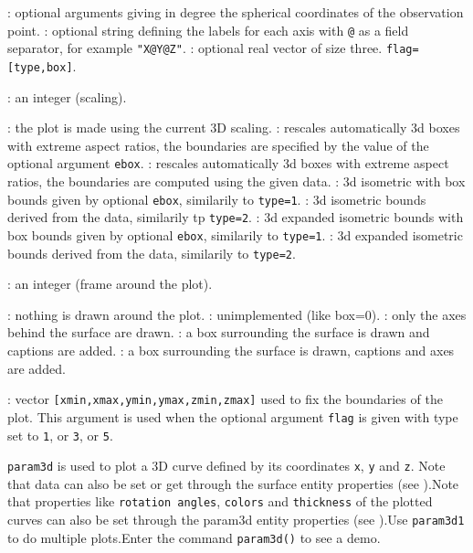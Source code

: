 \begin{parameters}
\begin{varlist}
    : optional arguments giving in degree the spherical coordinates of the
    observation point.
    : optional string defining the labels for each axis with \verb!@! as a field
    separator, for example \verb!"X@Y@Z"!.
    : optional real vector of size three.
    \verb!flag=[type,box]!.
    \begin{varlist}
      : an integer (scaling).
      \begin{varlist}
        : the plot is made using the current 3D scaling.
        : rescales automatically 3d boxes with extreme aspect
        ratios, the boundaries are specified by the value of the
        optional argument \verb!ebox!.
        : rescales automatically 3d boxes with extreme aspect
        ratios, the boundaries are computed using the given
        data.
        : 3d isometric with box bounds given by optional \verb!ebox!, similarily to
        \verb!type=1!.
        : 3d isometric bounds derived from the data, similarily tp \verb!type=2!.
        : 3d expanded isometric bounds with box bounds given by optional \verb!ebox!, similarily to
        \verb!type=1!.
        : 3d expanded isometric bounds derived from the data,
        similarily to \verb!type=2!.
      \end{varlist}
      : an integer (frame around the plot).
      \begin{varlist}
        : nothing is drawn around the plot.
        : unimplemented (like box=0).
        : only the axes behind the surface are drawn.
        : a box surrounding the surface is drawn and captions are added.
        : a box surrounding the surface is drawn, captions and
        axes are added.
      \end{varlist}
    \end{varlist}
    : vector \verb![xmin,xmax,ymin,ymax,zmin,zmax]! used to fix the boundaries of the plot. This argument is used
    when the optional argument \verb!flag! is given with type set to \verb!1!, or \verb!3!, or \verb!5!.
  \end{varlist}
\end{parameters}

\begin{mandescription}
  \verb!param3d! is used to plot a 3D curve defined by its
  coordinates \verb!x!, \verb!y! and \verb!z!. Note that
  data can also be set or get through the surface entity properties (see
   ).Note that properties like \verb!rotation angles!,
  \verb!colors! and \verb!thickness! of the plotted curves can
  also be set through the param3d entity properties (see
   ).Use \verb!param3d1! to do multiple plots.Enter the command \verb!param3d()! to see a demo.
\end{mandescription}

